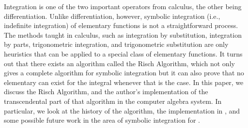 Integration is one of the two important operators from calculus, the
other being differentiation.  Unlike differentiation, however, symbolic
integration (i.e., indefinite integration) of elementary functions is
not a straightforward process. The methods taught in calculus, such as
integration by substitution, integration by parts, trigonometric
integration, and trigonometric substitution are only heuristics that can
be applied to a special class of elementary functions. It turns out that
there exists an algorithm called the Risch Algorithm, which not only
gives a complete algorithm for symbolic integration but it can also
prove that no elementary \antiderivative can exist for the integral
whenever that is the case. In this paper, we discuss the Risch
Algorithm, and the author's implementation of the transcendental part of
that algorithm in the \sympy computer algebra system.  In particular, we
look at the history of the algorithm, the implementation in \SymPy, and
some possible future work in the area of symbolic integration for \SymPy.

